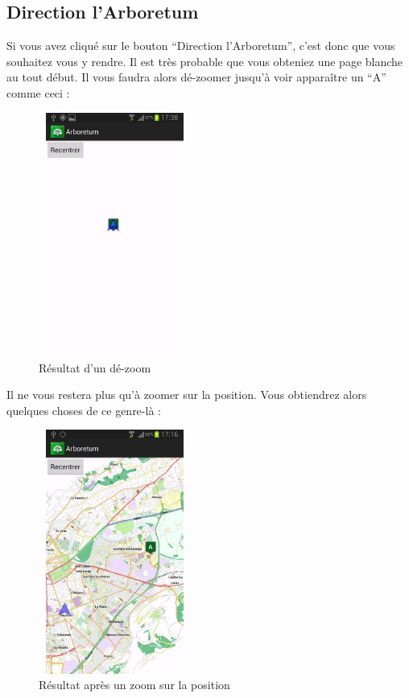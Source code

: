 \documentclass[a4paper,11pt]{article}
\begin{document}
    \subsection{Direction l'Arboretum}
    Si vous avez cliqué sur le bouton ``Direction l'Arboretum'', c'est donc que vous souhaitez vous y rendre. Il est très probable que vous obteniez
    une page blanche au tout début. Il vous faudra alors dé-zoomer jusqu'à voir apparaître un ``A'' comme ceci : 
     \begin{figure}[H]
     \begin{center}
      \includegraphics[width=5cm,height=8cm]{pointA.png}
    \caption{Résultat d'un dé-zoom}
     \end{center}
    \end{figure}
    \newpage
    Il ne vous restera plus qu'à zoomer sur la position. Vous obtiendrez alors quelques choses de ce genre-là :
    \begin{figure}[H]
     \begin{center}
      \includegraphics[width=5cm,height=8cm]{grenoble.png}
    \caption{Résultat après un zoom sur la position}
     \end{center}
    \end{figure}
    
\end{document}
